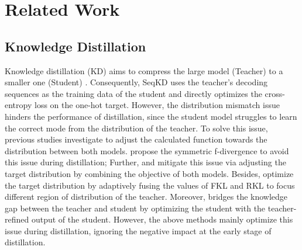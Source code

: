 \section{Related Work}
\subsection{Knowledge Distillation}
Knowledge distillation (KD) aims to compress the large model (Teacher) to a smaller one (Student) \citep{buciluǎ2006model, hinton2015distilling}. 
% 
Consequently, SeqKD \citep{kim2016sequence} uses the teacher’s decoding sequences as the training data of the student and directly optimizes the cross-entropy loss on the one-hot target.
% 
However, the distribution mismatch issue hinders the performance of distillation, since the student model struggles to learn the correct mode from the distribution of the teacher.
% 
To solve this issue, previous studies investigate to adjust the calculated function towards the distribution between both models.
% 
\citet{wen2023f} propose the symmetric f-divergence to avoid this issue during distillation;
% 
Further, \citet{gu2024minillm} and \citet{ko2024distillm} mitigate this issue via adjusting the target distribution by combining the objective of both models.
% 
Besides, \citet{wu2024rethinking} optimize the target distribution by adaptively fusing the values of FKL and RKL to focus different region of distribution of the teacher.
% 
Moreover, \citet{xu2024speculative} bridges the knowledge gap between the teacher and student by optimizing the student with the teacher-refined output of the student.
% 
However, the above methods mainly optimize this issue during distillation, ignoring the negative impact at the early stage of distillation.


